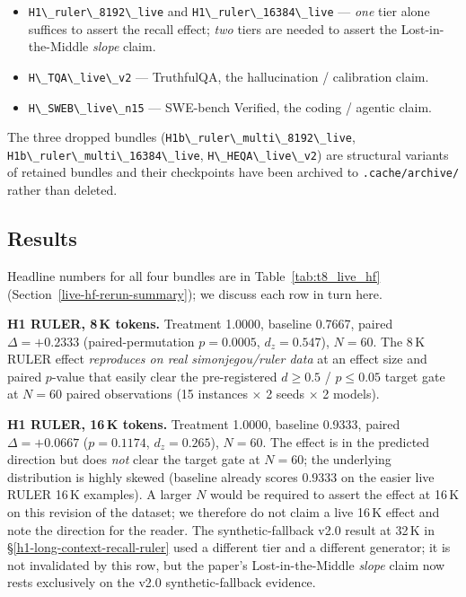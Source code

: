 \begin{itemize}
\tightlist
\item \passthrough{\lstinline!H1\_ruler\_8192\_live!} and
  \passthrough{\lstinline!H1\_ruler\_16384\_live!} --- \emph{one} tier
  alone suffices to assert the recall effect; \emph{two} tiers are
  needed to assert the Lost-in-the-Middle \emph{slope} claim.
\item \passthrough{\lstinline!H\_TQA\_live\_v2!} --- TruthfulQA, the
  hallucination / calibration claim.
\item \passthrough{\lstinline!H\_SWEB\_live\_n15!} --- SWE-bench
  Verified, the coding / agentic claim.
\end{itemize}

The three dropped bundles
(\passthrough{\lstinline!H1b\_ruler\_multi\_8192\_live!},
\passthrough{\lstinline!H1b\_ruler\_multi\_16384\_live!},
\passthrough{\lstinline!H\_HEQA\_live\_v2!}) are structural variants of
retained bundles and their checkpoints have been archived to
\passthrough{\lstinline!.cache/archive/!} rather than deleted.

\subsection{Results}\label{live-hf-results}

Headline numbers for all four bundles are in Table~\ref{tab:t8_live_hf}
(Section~\ref{live-hf-rerun-summary}); we discuss each row in turn here.

\textbf{H1 RULER, 8\,K tokens.} Treatment 1.0000, baseline 0.7667,
paired $\Delta=+0.2333$ (paired-permutation $p=0.0005$, $d_z=0.547$),
$N=60$. The 8\,K RULER effect \emph{reproduces on real
simonjegou/ruler data} at an effect size and paired $p$-value that
easily clear the pre-registered $d \ge 0.5$ / $p \le 0.05$ target gate
at \(N=60\) paired observations (15 instances $\times$ 2 seeds
$\times$ 2 models).

\textbf{H1 RULER, 16\,K tokens.} Treatment 1.0000, baseline 0.9333,
paired $\Delta=+0.0667$ ($p=0.1174$, $d_z=0.265$), $N=60$. The effect is
in the predicted direction but does \emph{not} clear the target gate at
$N=60$; the underlying distribution is highly skewed (baseline
already scores $0.9333$ on the easier live RULER 16\,K examples). A
larger $N$ would be required to assert the effect at 16\,K on this
revision of the dataset; we therefore do not claim a live 16\,K effect
and note the direction for the reader. The synthetic-fallback
v2.0 result at 32\,K in §\ref{h1-long-context-recall-ruler} used a
different tier and a different generator; it is not invalidated by this
row, but the paper's Lost-in-the-Middle \emph{slope} claim now rests
exclusively on the v2.0 synthetic-fallback evidence.

